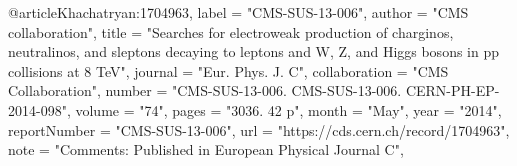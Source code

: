@article{Khachatryan:1704963,
      label          = "CMS-SUS-13-006",
      author        = "{CMS collaboration}",
      title         = "{Searches for electroweak production of charginos,
                       neutralinos, and sleptons decaying to leptons and W, Z, and
                       Higgs bosons in pp collisions at 8 TeV}",
      journal       = "Eur. Phys. J. C",
      collaboration = "CMS Collaboration",
      number        = "CMS-SUS-13-006. CMS-SUS-13-006. CERN-PH-EP-2014-098",
      volume        = "74",
      pages         = "3036. 42 p",
      month         = "May",
      year          = "2014",
      reportNumber  = "CMS-SUS-13-006",
      url           = "https://cds.cern.ch/record/1704963",
      note          = "Comments: Published in European Physical Journal C",
}

